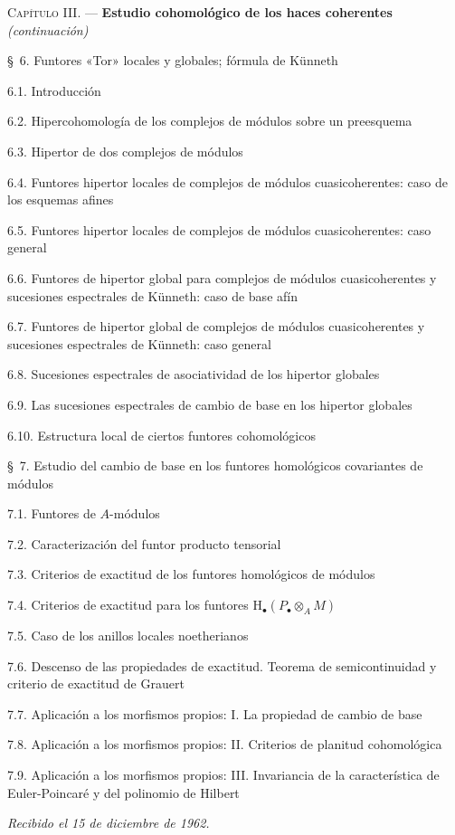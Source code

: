 \documentclass[10pt,oneside]{book}
\begin{document}
\begin{flushleft}
\textsc{Capítulo III.} --- \textbf{Estudio cohomológico de los haces coherentes}
\textit{(continuación)} 

\medskip
\S~6. Funtores «Tor» locales y globales; fórmula de Künneth 

6.1. Introducción 

6.2. Hipercohomología de los complejos de módulos sobre un preesquema 

6.3. Hipertor de dos complejos de módulos 

6.4. Funtores hipertor locales de complejos de módulos cuasicoherentes: caso
de los esquemas afines 

6.5. Funtores hipertor locales de complejos de módulos cuasicoherentes: caso
general 

6.6. Funtores de hipertor global para complejos de módulos cuasicoherentes y
sucesiones espectrales de Künneth: caso de base afín 

6.7. Funtores de hipertor global de complejos de módulos cuasicoherentes y
sucesiones espectrales de Künneth: caso general 

6.8. Sucesiones espectrales de asociatividad de los hipertor globales 

6.9. Las sucesiones espectrales de cambio de base en los hipertor globales

6.10. Estructura local de ciertos funtores cohomológicos 

\medskip
\S~7. Estudio del cambio de base en los funtores homológicos covariantes de
módulos 

7.1. Funtores de $A$-módulos 

7.2. Caracterización del funtor producto tensorial 

7.3. Criterios de exactitud de los funtores homológicos de módulos 

7.4. Criterios de exactitud para los funtores
$\mathrm H_\bullet(P_\bullet\otimes_A M)$ 

7.5. Caso de los anillos locales noetherianos 

7.6. Descenso de las propiedades de exactitud. Teorema de semicontinuidad y
criterio de exactitud de Grauert 

7.7. Aplicación a los morfismos propios: I. La propiedad de cambio de base

7.8. Aplicación a los morfismos propios: II. Criterios de planitud
cohomológica 

7.9. Aplicación a los morfismos propios: III. Invariancia de la
característica de Euler-Poincaré y del polinomio de Hilbert 

\begin{flushright}
\emph{Recibido el 15 de diciembre de 1962.}
\end{flushright}
\end{flushleft}
\end{document}
